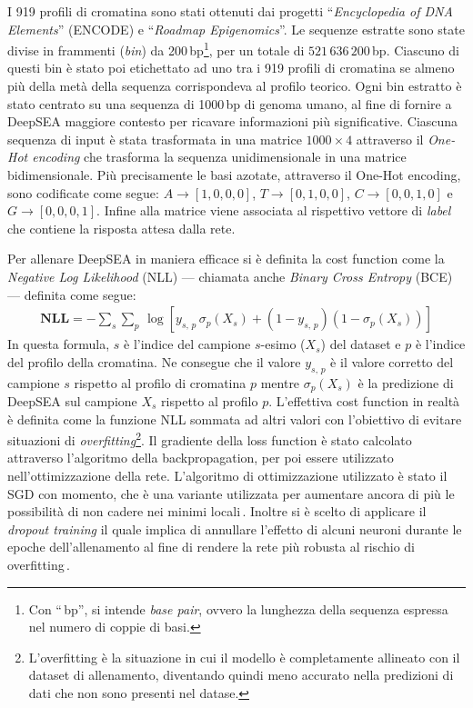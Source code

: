 I 919 profili di cromatina sono stati ottenuti dai progetti ``\textit{Encyclopedia of \acs{DNA} Elements}'' (\acs{ENCODE}) e ``\textit{Roadmap Epigenomics}''. Le sequenze estratte sono state divise in frammenti (\textit{bin}) da 200\,bp\footnote{Con ``\,bp'', si intende \textit{base pair}, ovvero la lunghezza della sequenza espressa nel numero di coppie di basi.}, per un totale di $521\,636\,200$\,bp. Ciascuno di questi bin è stato poi etichettato ad uno tra i 919 profili di cromatina se almeno più della metà della sequenza corrispondeva al profilo teorico. Ogni bin estratto è stato centrato su una sequenza di 1000\,bp di genoma umano, al fine di fornire a DeepSEA maggiore contesto per ricavare informazioni più significative. Ciascuna sequenza di input è stata trasformata in una matrice $1000\times 4$ attraverso il \textit{One-Hot encoding} che trasforma la sequenza unidimensionale in una matrice bidimensionale. Più precisamente le basi azotate, attraverso il One-Hot encoding, sono codificate come segue: $A \to \left[1, 0, 0, 0\right]$, $T \to \left[0, 1, 0, 0\right]$, $C \to \left[0, 0, 1, 0\right]$ e $G \to \left[0, 0, 0, 1\right]$. Infine alla matrice viene associata al rispettivo vettore di \textit{label} che contiene la risposta attesa dalla rete.

Per allenare DeepSEA in maniera efficace si è definita la cost function come la \textit{Negative Log Likelihood} (\acs{NLL}) — chiamata anche \textit{Binary Cross Entropy} (\acs{BCE}) — definita come segue:
% 
\begin{gather*}
    \mathbf{NLL} = - \sum_s \sum_p\, \log\left[ y_{s,\,p}\,\sigma_p\left(X_s\right)  + \left( 1- y_{s,\,p} \right)\left(1 - \sigma_p\left(X_s\right) \right) \right]
\end{gather*}
% 
\noindent In questa formula, $s$ è l'indice del campione $s$-esimo ($X_s$) del dataset e $p$ è l'indice del profilo della cromatina. Ne consegue che il valore $y_{s,\,p}$ è il valore corretto del campione $s$ rispetto al profilo di cromatina $p$ mentre $\sigma_p\left(X_s\right)$ è la predizione di DeepSEA sul campione $X_s$ rispetto al profilo $p$. L'effettiva cost function in realtà è definita come la funzione \acs{NLL} sommata ad altri valori con l'obiettivo di evitare situazioni di \textit{overfitting}\footnote{L'overfitting è la situazione in cui il modello è completamente allineato con il dataset di allenamento, diventando quindi meno accurato nella predizioni di dati che non sono presenti nel datase.}. Il gradiente della loss function è stato calcolato attraverso l'algoritmo della backpropagation, per poi essere utilizzato nell'ottimizzazione della rete. L'algoritmo di ottimizzazione utilizzato è stato il \acs{SGD} con momento, che è una variante utilizzata per aumentare ancora di più le possibilità di non cadere nei minimi locali\,\cite{aggarwal2018neural}. Inoltre si è scelto di applicare il \textit{dropout training} il quale implica di annullare l'effetto di alcuni neuroni durante le epoche dell'allenamento al fine di rendere la rete più robusta al rischio di overfitting\,\cite{nielsen2015neural}.

